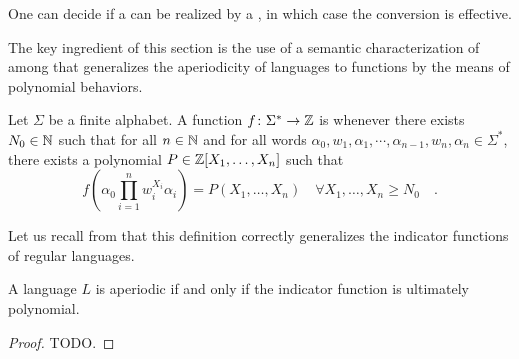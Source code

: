 \documentclass[sigconf,natbib=false,screen, review,anonymous]{acmart}
\begin{document}
\begin{corollary}
    One can decide if a  
    can be realized by a ,
    in which case the conversion is effective.
\end{corollary}

The key ingredient of this section is the use of a semantic characterization of
 among 
that generalizes the aperiodicity of languages to functions by the means of
polynomial behaviors.

\begin{definition}
    \label{ultimately-polynomial:def}
    Let $\Sigma$ be a finite alphabet. 
    A function $f \colon \Sigma^* \to \mathbb{Z}$
    is 
    whenever there exists $N_0 \in \mathbb{N}$ such that
    for all $n \in \mathbb{N}$
    and for all words $\alpha_0, w_1, \alpha_1, \cdots, \alpha_{n-1}, w_n, \alpha_n
    \in \Sigma^*$, there exists a polynomial $P \in \mathbb{Z}[X_1, \dots, X_n]$
    such that
    \begin{equation*}
        f\left(
            \alpha_0 \prod_{i = 1}^{n} w_i^{X_i} \alpha_i
        \right)
        = 
        P(X_1, \dots, X_n)
        \quad 
        \forall X_1, \dots, X_n \geq N_0
        \quad .
    \end{equation*}
\end{definition}


Let us recall from \cite{LOPEZ23b} that this definition correctly
generalizes the indicator functions of regular languages.

\begin{example}
    A language $L$ is aperiodic if and only if 
    the indicator function is ultimately polynomial.
\end{example}
\begin{proof}
    TODO.
\end{proof}
\end{document}
